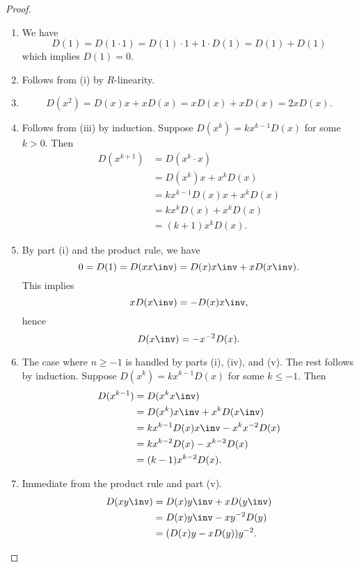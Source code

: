\begin{proof}
  \begin{enumerate}[label=(\roman*)]
    \item
      We have
        \[ D(1) = D(1 \cdot 1) = D(1) \cdot 1 + 1 \cdot D(1) = D(1) + D(1) \]
      which implies $D(1) = 0$.
    \item
      Follows from (i) by $R$-linearity.
    \item
        \[ D(x^2) = D(x)x + xD(x) = xD(x) + xD(x) = 2xD(x). \]
    \item
      Follows from (iii) by induction.
      Suppose $D(x^k) = kx^{k-1}D(x)$ for some $k > 0$. Then
      \begin{align*}
        D(x^{k+1})
          &= D(x^k \cdot x) \\
          &= D(x^k)x + x^kD(x) \\
          &= kx^{k-1}D(x)x + x^kD(x) \\
          &= kx^kD(x) + x^kD(x) \\
          &= (k + 1)x^kD(x).
      \end{align*}
    \item
      By part (i) and the product rule, we have
        \[ 0 = D(1) = D(xx\inv) = D(x)x\inv + xD(x\inv). \]
      This implies
        \[ xD(x\inv) = -D(x)x\inv, \]
      hence
        \[ D(x\inv) = -x^{-2}D(x). \]
    \item
      The case where $n \geq -1$ is handled by parts (i), (iv), and (v).
      The rest follows by induction.
      Suppose $D(x^k) = kx^{k-1}D(x)$ for some $k \leq -1$. Then
      \begin{align*}
        D(x^{k-1})
          &= D(x^kx\inv) \\
          &= D(x^k)x\inv + x^kD(x\inv) \\
          &= kx^{k-1}D(x)x\inv - x^kx^{-2}D(x) \\
          &= kx^{k-2}D(x) - x^{k-2}D(x) \\
          &= (k - 1)x^{k-2}D(x).
      \end{align*}
    \item
      Immediate from the product rule and part (v).
      \begin{align*}
        D(xy\inv)
          &= D(x)y\inv + xD(y\inv) \\
          &= D(x)y\inv - xy^{-2}D(y) \\
          &= (D(x)y - xD(y))y^{-2}.
      \end{align*}
  \end{enumerate}
\end{proof}

